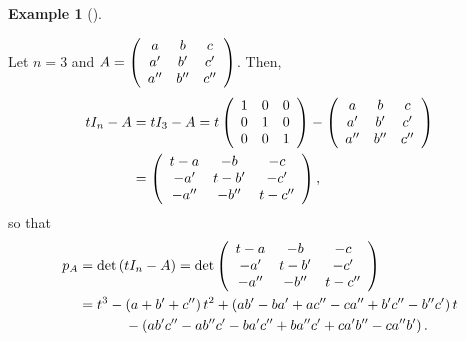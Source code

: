 \documentclass[numbers=enddot,12pt,final,onecolumn,notitlepage]{scrartcl}%
\numberwithin{exer}{subsection}
\theoremstyle{definition}
\newtheorem{exam}[theo]{Example}
\newenvironment{example}[1][]
{\begin{exam}[#1]\begin{leftbar}}
{\end{leftbar}\end{exam}}
\begin{document}
\begin{example}
\label{exa.schurtri.ch.pA.3x3}Let $n=3$ and $A=\left(
\begin{array}
[c]{ccc}%
a & b & c\\
a^{\prime} & b^{\prime} & c^{\prime}\\
a^{\prime\prime} & b^{\prime\prime} & c^{\prime\prime}%
\end{array}
\right)  $. Then,%
\begin{align*}
tI_{n}-A  &  =tI_{3}-A=t\left(
\begin{array}
[c]{ccc}%
1 & 0 & 0\\
0 & 1 & 0\\
0 & 0 & 1
\end{array}
\right)  -\left(
\begin{array}
[c]{ccc}%
a & b & c\\
a^{\prime} & b^{\prime} & c^{\prime}\\
a^{\prime\prime} & b^{\prime\prime} & c^{\prime\prime}%
\end{array}
\right) \\
&  =\left(
\begin{array}
[c]{ccc}%
t-a & -b & -c\\
-a^{\prime} & t-b^{\prime} & -c^{\prime}\\
-a^{\prime\prime} & -b^{\prime\prime} & t-c^{\prime\prime}%
\end{array}
\right)  ,
\end{align*}
so that%
\begin{align*}
p_{A}  &  =\det\left(  tI_{n}-A\right)  =\det\left(
\begin{array}
[c]{ccc}%
t-a & -b & -c\\
-a^{\prime} & t-b^{\prime} & -c^{\prime}\\
-a^{\prime\prime} & -b^{\prime\prime} & t-c^{\prime\prime}%
\end{array}
\right) \\
&  =t^{3}-\left(  a+b^{\prime}+c^{\prime\prime}\right)  t^{2}+\left(
ab^{\prime}-ba^{\prime}+ac^{\prime\prime}-ca^{\prime\prime}+b^{\prime
}c^{\prime\prime}-b^{\prime\prime}c^{\prime}\right)  t\\
&  \ \ \ \ \ \ \ \ \ \ -\left(  ab^{\prime}c^{\prime\prime}-ab^{\prime\prime
}c^{\prime}-ba^{\prime}c^{\prime\prime}+ba^{\prime\prime}c^{\prime}%
+ca^{\prime}b^{\prime\prime}-ca^{\prime\prime}b^{\prime}\right)  .
\end{align*}

\end{example}
\end{document}
